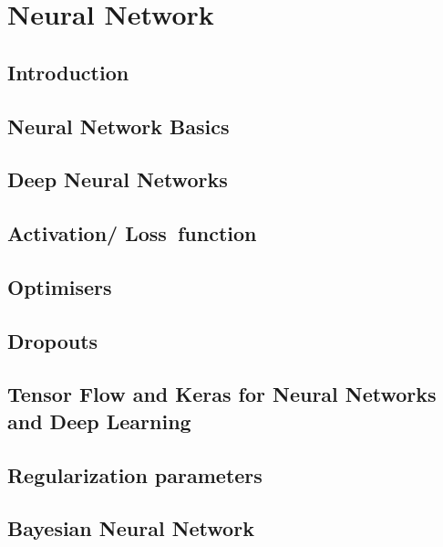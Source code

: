 \documentclass[11pt,fleqn]{book} %
\begin{document}
\part{Neural Network}


\chapter{Introduction}
\chapter{Neural Network Basics}
\chapter{Deep Neural Networks}
\chapter{Activation/ Loss function}
\chapter{Optimisers}
\chapter{Dropouts}
\chapter{Tensor Flow and Keras for Neural Networks and Deep Learning}
\chapter{Regularization parameters}
\chapter{Bayesian Neural Network}


\end{document}
